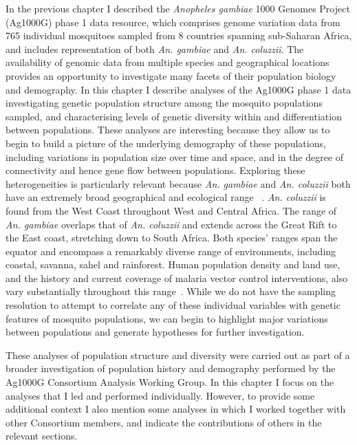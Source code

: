 \documentclass[a4paper,11pt,abstracton,hidelinks]{scrartcl}
\begin{document}
In the previous chapter I described the \textit{Anopheles gambiae} 1000 Genomes Project (Ag1000G) phase 1 data resource, which comprises genome variation data from 765 individual mosquitoes sampled from 8 countries spanning sub-Saharan Africa, and includes representation of both \textit{An. gambiae} and \textit{An. coluzzii}.
%
The availability of genomic data from multiple species and geographical locations provides an opportunity to investigate many facets of their population biology and demography.
%
In this chapter I describe analyses of the Ag1000G phase 1 data investigating genetic population structure among the mosquito populations sampled, and characterising levels of genetic diversity within and differentiation between populations.
%
These analyses are interesting because they allow us to begin to build a picture of the underlying demography of these populations, including variations in population size over time and space, and in the degree of connectivity and hence gene flow between populations.
%
Exploring these heterogeneities is particularly relevant because \textit{An. gambiae} and \textit{An. coluzzii} both have an extremely broad geographical and ecological range ~\parencite{dellaTorre2001,TeneFossog2015,Wiebe2017}.
%
\textit{An. coluzzii} is found from the West Coast throughout West and Central Africa.
%
The range of \textit{An. gambiae} overlaps that of \textit{An. coluzzii} and extends across the Great Rift to the East coast, stretching down to South Africa.
%
Both species' ranges span the equator and encompass a remarkably diverse range of environments, including coastal, savanna, sahel and rainforest.
%
Human population density and land use, and the history and current coverage of malaria vector control interventions, also vary substantially throughout this range~\parencite{BinswangerMkhize2017,WHO2019WMR}.
%
While we do not have the sampling resolution to attempt to correlate any of these individual variables with genetic features of mosquito populations, we can begin to highlight major variations between populations and generate hypotheses for further investigation.


These analyses of population structure and diversity were carried out as part of a broader investigation of population history and demography performed by the Ag1000G Consortium Analysis Working Group.
%
In this chapter I focus on the analyses that I led and performed individually.
%
However, to provide some additional context I also mention some analyses in which I worked together with other Consortium members, and indicate the contributions of others in the relevant sections.
\end{document}
